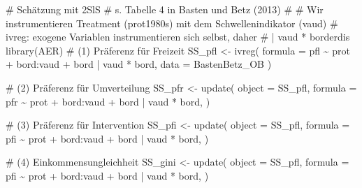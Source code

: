 \documentclass[
  a4paper,
  DIV=11,
  oneside]{scrreprt}
\newenvironment{Shaded}{\begin{snugshade}}{\end{snugshade}}
\newcommand{\AttributeTok}[1]{\textcolor[rgb]{0.40,0.45,0.13}{#1}}
\newcommand{\CommentTok}[1]{\textcolor[rgb]{0.37,0.37,0.37}{#1}}
\newcommand{\FunctionTok}[1]{\textcolor[rgb]{0.28,0.35,0.67}{#1}}
\newcommand{\NormalTok}[1]{\textcolor[rgb]{0.00,0.23,0.31}{#1}}
\newcommand{\OtherTok}[1]{\textcolor[rgb]{0.00,0.23,0.31}{#1}}
\newcommand{\SpecialCharTok}[1]{\textcolor[rgb]{0.37,0.37,0.37}{#1}}
\begin{document}
\begin{Shaded}
\begin{Highlighting}[]
\CommentTok{\# Schätzung mit 2SlS}
\CommentTok{\# s. Tabelle 4 in Basten und Betz (2013)}
\CommentTok{\#}
\CommentTok{\# Wir instrumentieren Treatment (\textasciigrave{}prot1980s\textasciigrave{}) mit dem Schwellenindikator (\textasciigrave{}vaud\textasciigrave{})}
\CommentTok{\# ivreg: exogene Variablen instrumentieren sich selbst, daher}
\CommentTok{\# \textquotesingle{} | vaud * borderdis \textquotesingle{}}
\FunctionTok{library}\NormalTok{(AER)}
\CommentTok{\# (1) Präferenz für Freizeit}
\NormalTok{SS\_pfl }\OtherTok{\textless{}{-}} \FunctionTok{ivreg}\NormalTok{(}
  \AttributeTok{formula =}\NormalTok{ pfl }\SpecialCharTok{\textasciitilde{}}\NormalTok{ prot }\SpecialCharTok{+}\NormalTok{ bord}\SpecialCharTok{:}\NormalTok{vaud }\SpecialCharTok{+}\NormalTok{ bord }\SpecialCharTok{|}\NormalTok{ vaud }\SpecialCharTok{*}\NormalTok{ bord,}
  \AttributeTok{data =}\NormalTok{ BastenBetz\_OB}
\NormalTok{)}

\CommentTok{\# (2) Präferenz für Umverteilung}
\NormalTok{SS\_pfr }\OtherTok{\textless{}{-}} \FunctionTok{update}\NormalTok{(}
  \AttributeTok{object =}\NormalTok{ SS\_pfl,}
  \AttributeTok{formula =}\NormalTok{ pfr }\SpecialCharTok{\textasciitilde{}}\NormalTok{ prot }\SpecialCharTok{+}\NormalTok{ bord}\SpecialCharTok{:}\NormalTok{vaud }\SpecialCharTok{+}\NormalTok{ bord }\SpecialCharTok{|}\NormalTok{ vaud }\SpecialCharTok{*}\NormalTok{ bord,}
\NormalTok{)}

\CommentTok{\# (3) Präferenz für Intervention}
\NormalTok{SS\_pfi }\OtherTok{\textless{}{-}} \FunctionTok{update}\NormalTok{(}
  \AttributeTok{object =}\NormalTok{ SS\_pfl,}
  \AttributeTok{formula =}\NormalTok{ pfi }\SpecialCharTok{\textasciitilde{}}\NormalTok{ prot }\SpecialCharTok{+}\NormalTok{ bord}\SpecialCharTok{:}\NormalTok{vaud }\SpecialCharTok{+}\NormalTok{ bord }\SpecialCharTok{|}\NormalTok{ vaud }\SpecialCharTok{*}\NormalTok{ bord,}
\NormalTok{)}

\CommentTok{\# (4) Einkommensungleichheit}
\NormalTok{SS\_gini }\OtherTok{\textless{}{-}} \FunctionTok{update}\NormalTok{(}
  \AttributeTok{object =}\NormalTok{ SS\_pfl,}
  \AttributeTok{formula =}\NormalTok{ pfi }\SpecialCharTok{\textasciitilde{}}\NormalTok{ prot }\SpecialCharTok{+}\NormalTok{ bord}\SpecialCharTok{:}\NormalTok{vaud }\SpecialCharTok{+}\NormalTok{ bord }\SpecialCharTok{|}\NormalTok{ vaud }\SpecialCharTok{*}\NormalTok{ bord,}
\NormalTok{)}
\end{Highlighting}
\end{Shaded}
\end{document}
